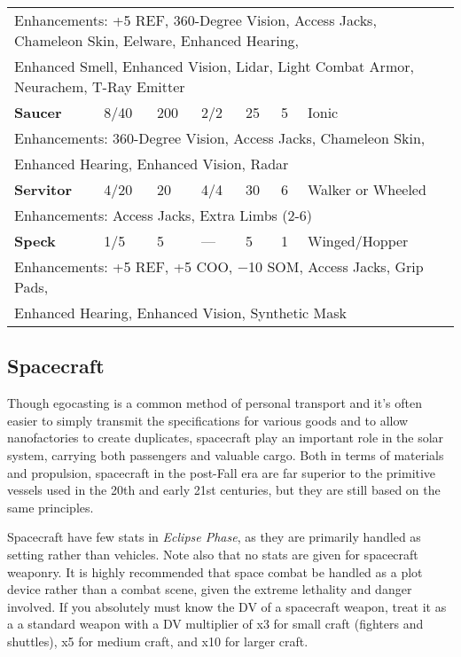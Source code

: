 \begin{table}
\begin{tabular}{|l|l|l|l|l|l|l|}
\multicolumn{7}{|l|}{Enhancements: +5 REF, 360-Degree Vision, Access Jacks, Chameleon Skin, Eelware, Enhanced Hearing, } \\ \multicolumn{7}{|l|}{Enhanced Smell, Enhanced Vision, Lidar, Light Combat Armor, Neurachem, T-Ray Emitter} \\ \hline

\textbf{Saucer}	&8/40	&200	&2/2	&25	&5	&Ionic \\ \hline

\multicolumn{7}{|l|}{Enhancements: 360-Degree Vision, Access Jacks, Chameleon Skin, } \\ \multicolumn{7}{|l|}{Enhanced Hearing, Enhanced Vision, Radar} \\ \hline

\textbf{Servitor}	&4/20	&20	&4/4	&30	&6	&Walker or Wheeled \\ \hline

\multicolumn{7}{|l|}{Enhancements: Access Jacks, Extra Limbs (2-6)} \\ \hline

\textbf{Speck}	&1/5	&5	&--- &5	&1	&Winged/Hopper \\ \hline

\multicolumn{7}{|l|}{Enhancements: +5 REF, +5 COO, $-$10 SOM, Access Jacks, Grip Pads, } \\ \multicolumn{7}{|l|}{Enhanced Hearing, Enhanced Vision, Synthetic Mask} \\ \hline

\end{tabular} \label{tab:robots} \end{table} 

\subsection{Spacecraft} \label{sec:spacecraft} 

Though egocasting is a common method of personal transport and it’s often easier to simply transmit the specifications for various goods and to allow nanofactories to create duplicates, spacecraft play an important role in the solar system, carrying both passengers and valuable cargo. Both in terms of materials and propulsion, spacecraft in the post-Fall era are far superior to the primitive vessels used in the 20th and early 21st centuries, but they are still based on the same principles. 

Spacecraft have few stats in \emph{Eclipse Phase}, as they are primarily handled as setting rather than vehicles. Note also that no stats are given for spacecraft weaponry. It is highly recommended that space combat be handled as a plot device rather than a combat scene, given the extreme lethality and danger involved. If you absolutely must know the DV of a spacecraft weapon, treat it as a a standard weapon with a DV multiplier of x3 for small craft (fighters and shuttles), x5 for medium craft, and x10 for larger craft. 

